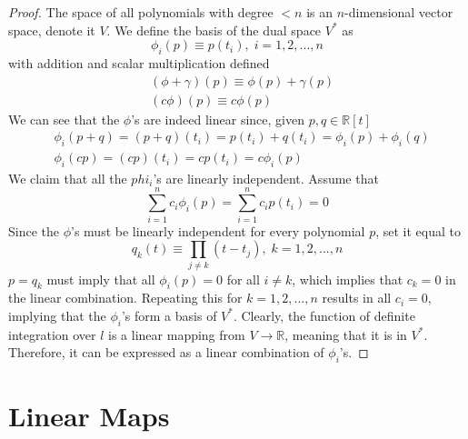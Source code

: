 \documentclass{article}
\begin{document}
    \begin{proof}
      The space of all polynomials with degree $< n$ is an $n$-dimensional vector space, denote it $V$. We define the basis of the dual space $V^*$ as 
      \begin{equation}
        \phi_i (p) \equiv p(t_i), \; i = 1, 2, ..., n
      \end{equation}
      with addition and scalar multiplication defined
      \begin{align*}
        & (\phi + \gamma) (p) \equiv \phi(p) + \gamma(p) \\
        & (c \phi) (p) \equiv c \phi (p) 
      \end{align*}
      We can see that the $\phi$'s are indeed linear since, given $p, q \in \mathbb{R}[t]$
      \begin{align*}
        & \phi_i (p + q) = (p + q) (t_i) = p(t_i) + q(t_i) = \phi_i (p) + \phi_i (q) \\
        & \phi_i (c p) = (c p) (t_i) = c p(t_i) = c \phi_i (p)
      \end{align*}
      We claim that all the $phi_i$'s are linearly independent. Assume that 
      \begin{equation}
        \sum_{i=1}^n c_i \phi_i (p) = \sum_{i=1}^n c_i p(t_i) = 0
      \end{equation}
      Since the $\phi$'s must be linearly independent for every polynomial $p$, set it equal to
      \begin{equation}
        q_k (t) \equiv \prod_{j \neq k} (t - t_j), \; k = 1, 2, ..., n
      \end{equation}
      $p = q_k$ must imply that all $\phi_i (p) = 0$ for all $i \neq k$, which implies that $c_k = 0$ in the linear combination. Repeating this for $k = 1, 2, ..., n$ results in all $c_i = 0$, implying that the $\phi_i$'s form a basis of $V^*$. Clearly, the function of definite integration over $l$ is a linear mapping from $V \longrightarrow \mathbb{R}$, meaning that it is in $V^*$. Therefore, it can be expressed as a linear combination of $\phi_i$'s. 
    \end{proof}

\section{Linear Maps}
\end{document}

